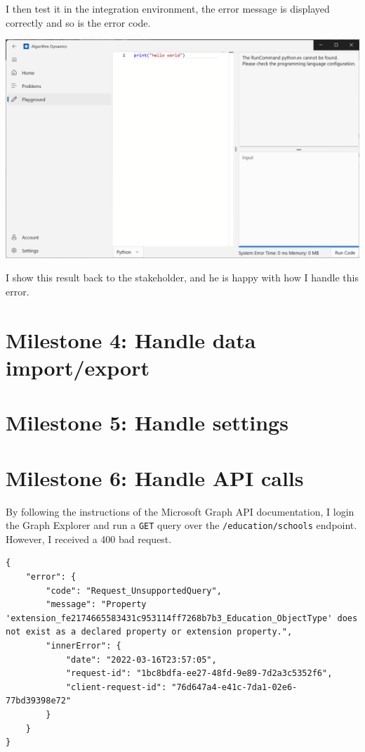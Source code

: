 \documentclass[a4paper]{report}
\newcommand{\code}{\texttt}
\begin{document}
I then test it in the integration environment, the error message is displayed correctly and so is the error code.

\includegraphics[width=\textwidth, height=\textheight, keepaspectratio]{SystemErrorReport}

I show this result back to the stakeholder, and he is happy with how I handle this error.

\section{Milestone 4: Handle data import/export}

\section{Milestone 5: Handle settings}

\section{Milestone 6: Handle API calls}

By following the instructions of the Microsoft Graph API documentation\cite{microsoft:docs:education-overview}, I login the Graph Explorer\cite{microsoft:graph-explorer} and run a \code{GET} query over the \code{/education/schools} endpoint. However, I received a 400 bad request.

\begin{verbatim}
{
    "error": {
        "code": "Request_UnsupportedQuery",
        "message": "Property 'extension_fe2174665583431c953114ff7268b7b3_Education_ObjectType' does not exist as a declared property or extension property.",
        "innerError": {
            "date": "2022-03-16T23:57:05",
            "request-id": "1bc8bdfa-ee27-48fd-9e89-7d2a3c5352f6",
            "client-request-id": "76d647a4-e41c-7da1-02e6-77bd39398e72"
        }
    }
}
\end{verbatim}
\end{document}
